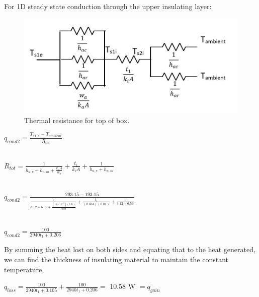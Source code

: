 For 1D steady state conduction through the upper insulating layer: \\

	\begin{figure}[h!]
    \centering
    \includegraphics[scale=0.6]{4-experiment-design/img/mechanical/thermalresistance2.JPG}
	\caption{Thermal resistance for top of box.}
	\label{fig:thermalresistance2}
	\end{figure} 

\begin{center}
 $q_{cond2} = \frac{T_{s1,e}-T_{ambient}}{R_{tot}} $\\
 
 \ 
 
 $R_{tot} = \frac{1}{h_{a,e}+h_{a,m}+\frac{k_{a}A}{w_{a}}} + \frac{t_{1}}{k_{i}A} + \frac{1}{h_{a,e}+h_{a,m}}  $\\
 
 \
 \ 
 
 $q_{cond2} = \frac{293.15 - 193.15}{\frac{1}{3.12+6.59+\frac{(15\times10^{-3})(0.01)}{0.08}} + \frac{t_{1}}{(0.034)(0.01)} + \frac{1}{3.12+6.59}} $\\
 
 \  
 \ 
 
 $q_{cond2} = \frac{100}{2940t_{1}+0.206} $\\
 
\end{center}

By summing the heat lost on both sides and equating that to the heat generated, we can find the thickness of insulating material to maintain the constant temperature. \\

\begin{center}
 $q_{loss} = \frac{100}{2940t_{1}+0.105} + \frac{100}{2940t_{1}+0.206} =$ 
10.58 W
$= q_{gain} $\\
\end{center}

